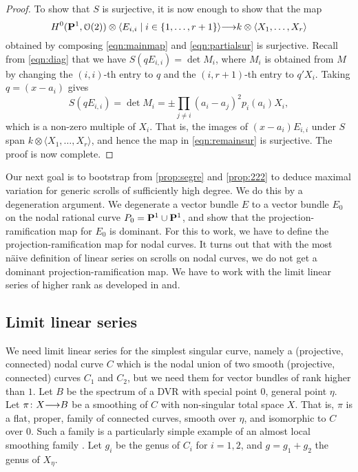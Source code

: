 \documentclass[11pt,reqno]{amsart}
\theoremstyle{plain}
\theoremstyle{definition}
\theoremstyle{remark}
\numberwithin{equation}{section}
\renewcommand{\k}{k}
\renewcommand{\to}{{\longrightarrow}}
\numberwithin{equation}{section}
\renewcommand{\O}{\mathcal O}
\begin{document}
\begin{proof}
  To show that $S$ is surjective, it is now enough to show that the map
  \begin{equation}\label{eqn:remainsur}
    H^0(\P^1, \O(2)) \otimes \langle  E_{i,i} \mid i \in \{1, \dots, r+1\} \rangle \to \k \otimes \langle  X_1, \dots, X_r \rangle
  \end{equation}
  obtained by composing \eqref{eqn:mainmap} and \eqref{eqn:partialsur} is surjective.
  Recall from \eqref{eqn:diag} that we have $S(qE_{i,i}) = \det M_i$, where $M_i$ is obtained from $M$ by changing the $(i,i)$-th entry to $q$ and the $(i, r+1)$-th entry to $q'X_i$.
  Taking $q = (x-a_i)$ gives
  \[ S(qE_{i,i}) = \det M_i = \pm \prod_{j \neq i} (a_i-a_j)^2 p_i(a_i) X_i,\]
  which is a non-zero multiple of $X_i$.
  That is, the images of $(x-a_i)E_{i,i}$ under $S$ span $\k \otimes \langle  X_1, \dots, X_r \rangle$, and hence the map in \eqref{eqn:remainsur} is surjective.
  The proof is now complete.
\end{proof}

Our next goal is to bootstrap from \autoref{prop:segre} and \autoref{prop:222} to deduce maximal variation for generic scrolls of sufficiently high degree.
We do this by a degeneration argument.
We degenerate a vector bundle $E$ to a vector bundle $E_0$ on the nodal rational curve $P_0 = \P^1 \cup \P^1$, and show that the projection-ramification map for $E_0$ is dominant.
For this to work, we have to define the projection-ramification map for nodal curves.
It turns out that with the most n\"aive definition of linear series on scrolls on nodal curves, we do not get a dominant projection-ramification map.
We have to work with the limit linear series of higher rank as developed in \cite{tei:} and\cite{oss:14}.

\subsection{Limit linear series}\label{sec:lls}
We need limit linear series for the simplest singular curve, namely a (projective, connected) nodal curve $C$ which is the nodal union of two smooth (projective, connected) curves $C_1$ and $C_2$, but we need them for vector bundles of rank higher than $1$.
Let $B$ be the spectrum of a DVR with special point $0$, general point $\eta$.
Let $\pi \from X \to B$ be a smoothing of $C$ with non-singular total space $X$.
That is, $\pi$ is a flat, proper, family of connected curves, smooth over $\eta$, and isomorphic to $C$ over $0$.
Such a family is a particularly simple example of an almost local smoothing family \cite[\S~2.1--2.2]{oss:14}.
Let $g_i$ be the genus of $C_i$ for $i = 1, 2$, and $g = g_1+g_2$ the genus of $X_\eta$.
\end{document}
